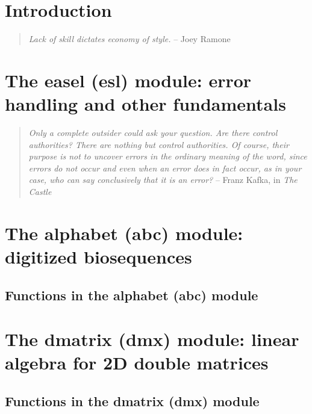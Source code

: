 \documentclass[11pt]{article}
\begin{document}


\newpage
\tableofcontents

\newpage
\section{Introduction}

\vspace*{\fill}
\begin{quote}
\emph{Lack of skill dictates economy of style.} \hspace{3em} -- Joey Ramone
\end{quote}     


\newpage
\section{The easel (esl) module: error handling and other fundamentals}

\vspace*{\fill}
\begin{quote}
\emph{Only a complete outsider could ask your question. Are there
control authorities? There are nothing but control authorities. Of
course, their purpose is not to uncover errors in the ordinary meaning
of the word, since errors do not occur and even when an error does in
fact occur, as in your case, who can say conclusively that it is an
error?} \hspace{3em} -- Franz Kafka, in \emph{The Castle}
\end{quote}     

\newpage
\section{The alphabet (abc) module: digitized biosequences}

\subsection{Functions in the alphabet (abc) module}


\newpage
\section{The dmatrix (dmx) module: linear algebra for 2D double matrices}
\subsection{Functions in the dmatrix (dmx) module}

\end{document}
